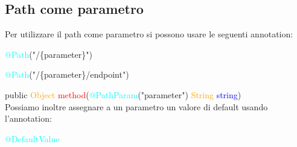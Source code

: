 \documentclass[11pt, letterpaper, titlepage]{article}
\newcommand{\class}[1]{\textcolor{orange}{#1}}
\newcommand{\object}[1]{\textcolor{blue}{#1}}
\newcommand{\method}[1]{\textcolor{red}{#1}}
\newcommand{\annotation}[1]{\textcolor{cyan}{#1}}
\begin{document}
\subsection{Path come parametro}
Per utilizzare il path come parametro si possono usare le seguenti annotation:\par
\annotation{@Path}("/\{parameter\}")\par
\annotation{@Path}("/\{parameter\}/endpoint")\par
public \class{Object} \method{method}(\annotation{@PathParam}("parameter") \class{String} \object{string})\\
Possiamo inoltre assegnare a un parametro un valore di default usando l'annotation:\par
\annotation{@DefaultValue}
\end{document}
